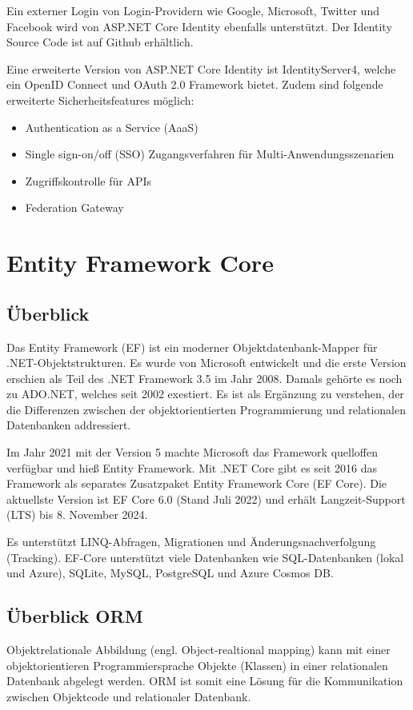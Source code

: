 Ein externer Login von Login-Providern wie Google, Microsoft, Twitter und Facebook wird von ASP.NET Core Identity ebenfalls unterstützt.
Der Identity Source Code ist auf Github erhältlich.

Eine erweiterte Version von ASP.NET Core Identity ist IdentityServer4, welche ein OpenID Connect und OAuth 2.0 Framework bietet.
Zudem sind folgende erweiterte Sicherheitsfeatures möglich:

\begin{itemize}
    \item Authentication as a Service (AaaS)
    \item Single sign-on/off (SSO) Zugangsverfahren für Multi-Anwendungsszenarien
    \item Zugriffskontrolle für APIs
    \item Federation Gateway
\end{itemize}

\section{Entity Framework Core}
\subsection{Überblick}

Das Entity Framework (EF) ist ein moderner Objektdatenbank-Mapper für .NET-Objektstrukturen. Es
wurde von Microsoft entwickelt und die erste Version erschien als Teil des .NET Framework 3.5 im
Jahr 2008. Damals gehörte es noch zu ADO.NET, welches seit 2002 exestiert.  Es ist als Ergänzung zu verstehen, 
der die Differenzen zwischen der objektorientierten Programmierung und relationalen Datenbanken addressiert.

Im Jahr 2021 mit der Version 5 machte Microsoft das Framework quelloffen verfügbar und hieß
Entity Framework. Mit .NET Core gibt es seit 2016 das Framework als separates Zusatzpaket Entity
Framework Core (EF Core). Die aktuellste Version ist EF Core 6.0 (Stand Juli 2022) und 
erhält Langzeit-Support (LTS) bis 8. November 2024.

Es unterstützt LINQ-Abfragen, Migrationen und Änderungsnachverfolgung (Tracking). EF-Core
unterstützt viele Datenbanken wie SQL-Datenbanken (lokal und Azure), SQLite, MySQL, PostgreSQL
und Azure Cosmos DB.

\subsection{Überblick ORM}
Objektrelationale Abbildung (engl. Object-realtional mapping) kann mit einer objektorientieren
Programmiersprache Objekte (Klassen) in einer relationalen Datenbank abgelegt werden. ORM ist
somit eine Lösung für die Kommunikation zwischen Objektcode und relationaler Datenbank.


